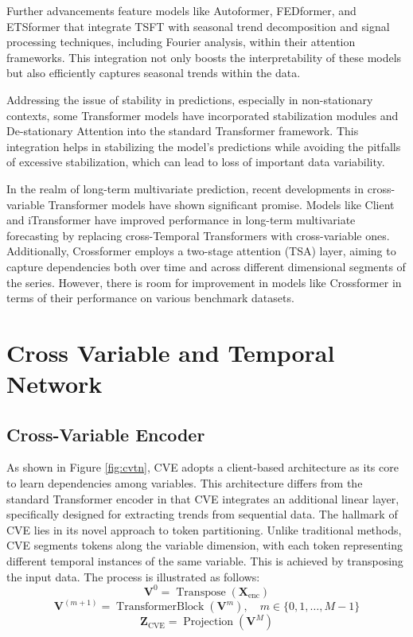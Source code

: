 Further advancements feature models like Autoformer, FEDformer\cite{zhou2022fedformer}, and ETSformer\cite{woo2022etsformer} that integrate TSFT with seasonal trend decomposition and signal processing techniques, including Fourier analysis, within their attention frameworks. This integration not only boosts the interpretability of these models but also efficiently captures seasonal trends within the data.

Addressing the issue of stability in predictions, especially in non-stationary contexts, some Transformer models have incorporated stabilization modules and De-stationary Attention into the standard Transformer framework\cite{liu2022non}. This integration helps in stabilizing the model's predictions while avoiding the pitfalls of excessive stabilization, which can lead to loss of important data variability.

In the realm of long-term multivariate prediction, recent developments in cross-variable Transformer models have shown significant promise. Models like Client\cite{gao2023client} and iTransformer\cite{liu2023itransformer} have improved performance in long-term multivariate forecasting by replacing cross-Temporal Transformers with cross-variable ones. Additionally, Crossformer\cite{zhang2022crossformer} employs a two-stage attention (TSA) layer, aiming to capture dependencies both over time and across different dimensional segments of the series. However, there is room for improvement in models like Crossformer in terms of their performance on various benchmark datasets.

\section{Cross Variable and Temporal Network}
\subsection{Cross-Variable Encoder}
As shown in Figure \ref{fig:cvtn}, CVE adopts a client-based architecture as its core to learn dependencies among variables. This architecture differs from the standard Transformer encoder in that CVE integrates an additional linear layer, specifically designed for extracting trends from sequential data. The hallmark of CVE lies in its novel approach to token partitioning. Unlike traditional methods, CVE segments tokens along the variable dimension, with each token representing different temporal instances of the same variable. This is achieved by transposing the input data. The process is illustrated as follows:
\begin{equation}
  \mathbf{V}^0 = \operatorname{Transpose}(\mathbf{X}_{\text{enc}})
\end{equation}
\begin{equation}
  \mathbf{V}^{(m+1)} = \operatorname{Transformer Block}(\mathbf{V}^{m}), \quad m \in \{0, 1, \ldots, M-1\}
\end{equation}
\begin{equation}
  \mathbf{Z}_{\text{CVE}} = \operatorname{Projection}(\mathbf{V}^{M})
\end{equation}

